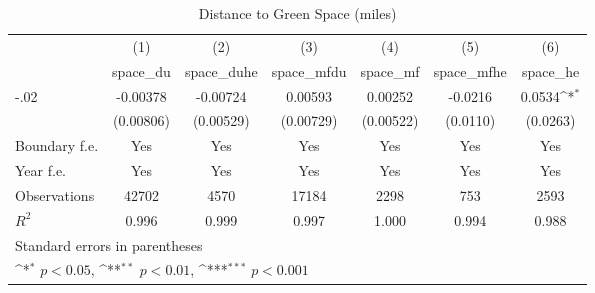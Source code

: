 \begin{table}[htbp]\centering
\def\sym#1{\ifmmode^{#1}\else\(^{#1}\)\fi}
\caption{Distance to Green Space (miles)}
\begin{tabular}{l*{6}{c}}
\hline\hline
                    &\multicolumn{1}{c}{(1)}&\multicolumn{1}{c}{(2)}&\multicolumn{1}{c}{(3)}&\multicolumn{1}{c}{(4)}&\multicolumn{1}{c}{(5)}&\multicolumn{1}{c}{(6)}\\
                    &\multicolumn{1}{c}{space\_du}&\multicolumn{1}{c}{space\_duhe}&\multicolumn{1}{c}{space\_mfdu}&\multicolumn{1}{c}{space\_mf}&\multicolumn{1}{c}{space\_mfhe}&\multicolumn{1}{c}{space\_he}\\
\hline
-.02                &    -0.00378         &    -0.00724         &     0.00593         &     0.00252         &     -0.0216         &      0.0534\sym{*}  \\
                    &   (0.00806)         &   (0.00529)         &   (0.00729)         &   (0.00522)         &    (0.0110)         &    (0.0263)         \\
[1em]
Boundary f.e.       &         Yes         &         Yes         &         Yes         &         Yes         &         Yes         &         Yes         \\
[1em]
Year f.e.           &         Yes         &         Yes         &         Yes         &         Yes         &         Yes         &         Yes         \\
\hline
Observations        &       42702         &        4570         &       17184         &        2298         &         753         &        2593         \\
\(R^{2}\)           &       0.996         &       0.999         &       0.997         &       1.000         &       0.994         &       0.988         \\
\hline\hline
\multicolumn{7}{l}{\footnotesize Standard errors in parentheses}\\
\multicolumn{7}{l}{\footnotesize \sym{*} \(p<0.05\), \sym{**} \(p<0.01\), \sym{***} \(p<0.001\)}\\
\end{tabular}
\end{table}

